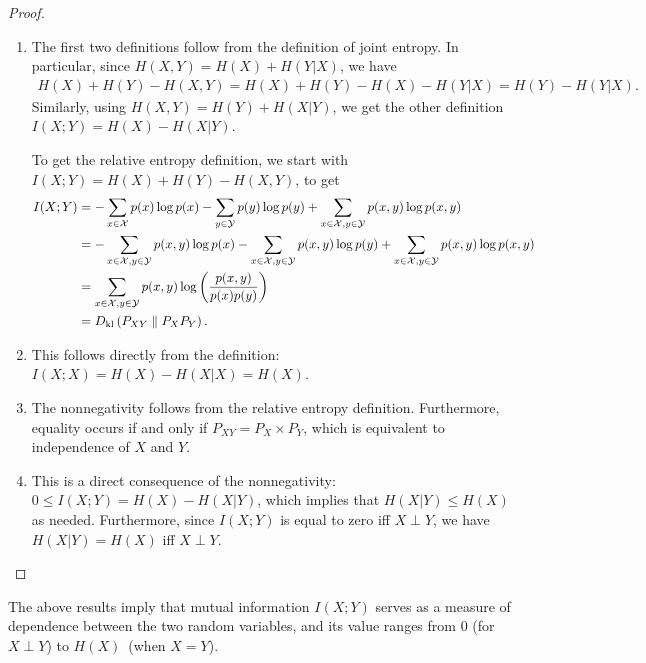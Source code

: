         \begin{proof}
            \begin{enumerate}[label=(\alph*)]
                \item The first two definitions follow from the definition of joint entropy. In particular, since $H(X, Y) = H(X) + H(Y|X)$, we have  
                \begin{align}
                    H(X) + H(Y) - H(X, Y) = H(X) + H(Y) - H(X) - H(Y|X) =  H(Y) - H(Y|X). 
                \end{align}
                Similarly, using $H(X, Y) = H(Y) + H(X|Y)$, we get the other definition $I(X;Y) = H(X) - H(X|Y)$. 

                To get the relative entropy definition, we start with $I(X;Y) = H(X) + H(Y) - H(X,Y)$, to get 
                \begin{align}
                    I(X;Y) &= -\sum_{x \in \mathcal{X}} p(x) \log p(x) - \sum_{y \in \mathcal{Y}} p(y) \log p(y)  + \sum_{x\in \mathcal{X}, y\in \mathcal{Y}} p(x, y) \log p(x, y) \\
                    &= -\sum_{x \in \mathcal{X}, y \in \mathcal{Y}} p(x, y) \log p(x) - \sum_{x \in \mathcal{X}, y \in \mathcal{Y}} p(x, y) \log p(y)  + \sum_{x\in \mathcal{X}, y\in \mathcal{Y}} p(x, y) \log p(x, y)  \\
                    &= \sum_{x \in \mathcal{X}, y \in \mathcal{Y}} p(x, y) \log \left(\frac{p(x, y)}{p(x) p(y)} \right) \\
                    & = D_{\text{kl}} \left( P_{XY} \parallel P_X P_Y \right). 
                \end{align}
                \item This follows directly from the definition: $I(X; X) = H(X) - H(X|X) = H(X)$. 
                \item The nonnegativity follows from the relative entropy definition. Furthermore, equality occurs if and only if $P_{XY} = P_X \times P_Y$, which is equivalent to independence of $X$ and $Y$. 
                \item This is a direct consequence of the nonnegativity: $0 \leq I(X;Y) = H(X) - H(X|Y)$, which implies that $H(X|Y) \leq H(X)$ as needed. Furthermore, since $I(X;Y)$ is equal to zero iff $X \perp Y$, we have $H(X|Y) = H(X)$ iff $X \perp Y$.  
            \end{enumerate}
        \end{proof}
        The above results imply that mutual information $I(X; Y)$ serves as a measure of dependence between the two random variables, and its value ranges from $0$ (for $X \perp Y$)  to $H(X)$~(when $X = Y$). 
        
